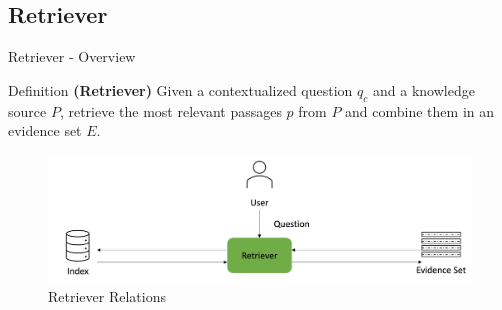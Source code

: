 \documentclass{beamer}
\begin{document}
\subsection*{Retriever}
\begin{frame}{Retriever - Overview}
  \vfill

  \begin{block}{Definition}
    \textbf{(Retriever)} Given a contextualized question $q_c$ and a knowledge source $P$, retrieve the most relevant passages $p$ from $P$ and combine them in an evidence set $E$.
  \end{block}

  \begin{figure}
    \includegraphics[width=\textwidth]{Grafiken/Retriever_Fields_of_Improvement.png}
    \caption{Retriever Relations}
  \end{figure}
\end{frame}
\end{document}
